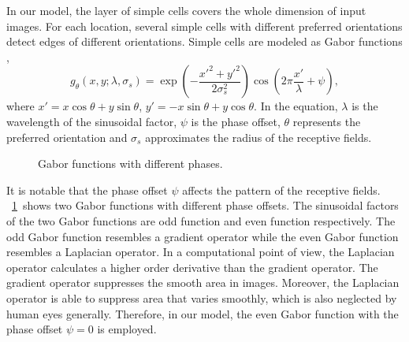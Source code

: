 \documentclass[5p]{elsarticle}
\begin{document}
In our model, the layer of simple cells covers the whole dimension of input images.
For each location, several simple cells with different preferred orientations 
detect edges of different orientations.
Simple cells are modeled as Gabor functions \cite{gabor1946},
\begin{equation}\label{equ:gabor}
g_{\theta}(x,y;\lambda,\sigma_s)
=\exp \left(-\frac{x'^2+y'^2}{2\sigma_s^2}\right)
\cos \left(2\pi\frac{x'}{\lambda}+\psi\right),
\end{equation}
where $x'=x\cos\theta+y\sin\theta$, $y'=-x\sin\theta+y\cos\theta$.
In the equation, $\lambda$ is the wavelength of the sinusoidal factor, 
$\psi$ is the phase offset, 
$\theta$ represents the preferred orientation and 
$\sigma_s$ approximates the radius of the receptive fields.

\begin{figure}
\centering
{}
\caption{Gabor functions with different phases.}
\label{fig:4}
\end{figure}

It is notable that the phase offset $\psi$ affects the pattern of the receptive fields.
\figurename~\ref{fig:4}~shows two Gabor functions with different phase offsets.
The sinusoidal factors of the two Gabor functions 
are odd function and even function respectively.
The odd Gabor function resembles a gradient operator
while the even Gabor function resembles a Laplacian operator.
In a computational point of view, 
the Laplacian operator calculates a higher order derivative 
than the gradient operator.
The gradient operator suppresses the smooth area in images.
Moreover, the Laplacian operator is able 
to suppress area that varies smoothly, 
which is also neglected by human eyes generally.
Therefore, in our model, the even Gabor function 
with the phase offset $\psi=0$ is employed.
\end{document}
